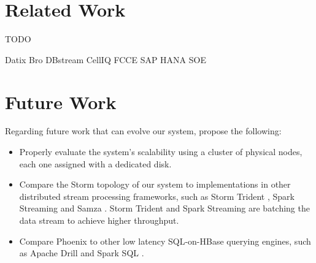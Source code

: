 \section{Related Work}

TODO

Datix
Bro
DBstream
CellIQ
FCCE
SAP HANA SOE

\section{Future Work}

Regarding future work that can evolve our system, propose the following:
\begin{itemize}
\item Properly evaluate the system's scalability using a cluster of physical nodes, each one assigned with a dedicated disk.
\item Compare the Storm topology of our system to implementations in other distributed stream processing frameworks, such as Storm Trident \cite{trident}, Spark Streaming \cite{spark_streaming} and Samza \cite{samza}. Storm Trident and Spark Streaming are batching the data stream to achieve higher throughput.
\item Compare Phoenix to other low latency SQL-on-HBase querying engines, such as Apache Drill \cite{drill} and Spark SQL \cite{spark_sql}.
\end{itemize}


\cleardoublepage
